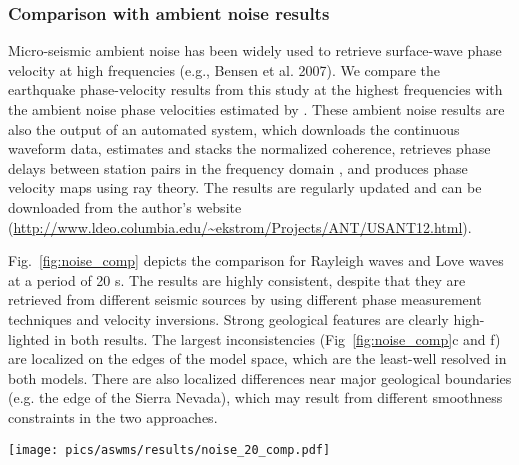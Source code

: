 
\subsubsection{Comparison with ambient noise results}
\label{sec:noise_comp}

Micro-seismic ambient noise has been widely used to retrieve surface-wave phase velocity at high frequencies (e.g., Bensen et al. 2007). We compare the earthquake phase-velocity results from this study at the highest frequencies with the ambient noise phase velocities estimated by \citet{Ekstrom:2013dr}. These ambient noise results are also the output of an automated system, which downloads the continuous waveform data, estimates and stacks the normalized coherence, retrieves phase delays between station pairs in the frequency domain \citep{Ekstrom:2009iv}, and produces phase velocity maps using ray theory. The results are regularly updated and can be downloaded from the author's website (\url{http://www.ldeo.columbia.edu/~ekstrom/Projects/ANT/USANT12.html}).

Fig.~\ref{fig:noise_comp} depicts the comparison for Rayleigh waves and Love waves at a period of 20 s. The results are highly consistent, despite that they are retrieved from different seismic sources by using different phase measurement techniques and velocity inversions. Strong geological features are clearly high-lighted in both results. The largest inconsistencies (Fig~\ref{fig:noise_comp}c and f) are localized on the edges of the model space, which are the least-well resolved in both models.  There are also localized differences near major geological boundaries (e.g. the edge of the Sierra Nevada), which may result from different smoothness constraints in the two approaches.

\begin{figure*}
	\center
	\texttt{[image: pics/aswms/results/noise\_20\_comp.pdf]}
	\caption[20-s Rayleigh and Love wave phase-velocity comparison between the earthquake results (this study) and the ambient noise  results (Ekstr\"om 2013).]{20-s Rayleigh and Love wave phase-velocity comparison between the earthquake results (this study) and the ambient noise  results (Ekstr\"om 2013). \textbf{a)} The earthquake result. \textbf{b)} The ambient noise result. \textbf{c)} The subtraction of b) from a). \textbf{d)-f)}: Same as a)-c), but for Love waves.}
	\label{fig:noise_comp}
\end{figure*}

